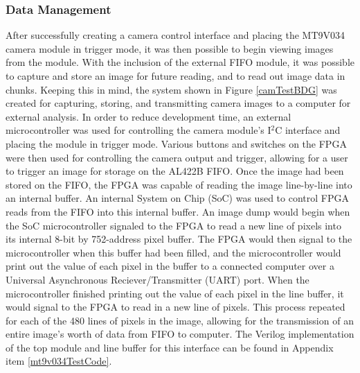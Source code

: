 \subsubsection{Data Management} 
After successfully creating a camera control interface and placing the MT9V034 camera module in trigger mode, it was then possible to begin viewing images from the module. With the inclusion of the external FIFO module, it was  possible to capture and store an image for future reading, and to read out image data in chunks. Keeping this in mind, the system shown in Figure \ref{camTestBDG} was created for capturing, storing, and transmitting camera images to a computer for external analysis. In order to reduce development time, an external microcontroller was used for controlling the camera module's I$^2$C interface and placing the module in trigger mode. Various buttons and switches on the FPGA were then used for controlling the camera output and trigger, allowing for a user to trigger an image for storage on the AL422B FIFO. Once the image had been stored on the FIFO, the FPGA was capable of reading the image line-by-line into an internal buffer. An internal System on Chip (SoC) was used to control FPGA reads from the FIFO into this internal buffer. An image dump would begin when the SoC microcontroller signaled to the FPGA to read a new line of pixels into its internal 8-bit by 752-address pixel buffer. The FPGA would then signal to the microcontroller when this buffer had been filled, and the microcontroller would print out the value of each pixel in the buffer to a connected computer over a Universal Asynchronous Reciever/Transmitter (UART) port. When the microcontroller finished printing out the value of each pixel in the line buffer, it would signal to the FPGA to read in a new line of pixels. This process repeated for each of the 480 lines of pixels in the image, allowing for the transmission of an entire image's worth of data from FIFO to computer. The Verilog implementation of the top module and line buffer for this interface can be found in Appendix item \ref{mt9v034TestCode}.

